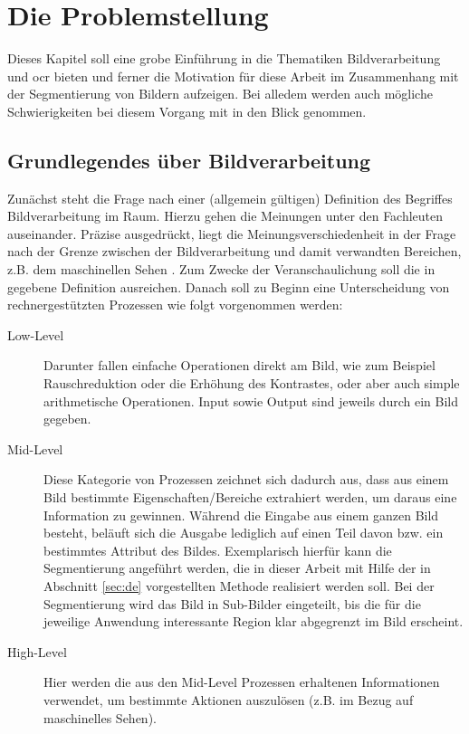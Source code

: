 \chapter{Die Problemstellung}
\label{sec:prob}
	
	Dieses Kapitel soll eine grobe Einführung in die Thematiken Bildverarbeitung und \gls{ocr} bieten und ferner die Motivation für diese Arbeit im Zusammenhang mit der Segmentierung von Bildern aufzeigen. Bei alledem werden auch mögliche Schwierigkeiten bei diesem Vorgang mit in den Blick genommen.
	
	\section{Grundlegendes über Bildverarbeitung}
	\label{sec:bild-basics}
	
		Zunächst steht die Frage nach einer (allgemein gültigen) Definition des Begriffes Bildverarbeitung im Raum. Hierzu gehen die Meinungen unter den Fachleuten auseinander. Präzise ausgedrückt, liegt die Meinungsverschiedenheit in der Frage nach der Grenze zwischen der Bildverarbeitung und damit verwandten Bereichen, z.B. dem maschinellen Sehen \cite[S. 2]{gonzalez-woods}. Zum Zwecke der Veranschaulichung soll die in \cite[S. 2]{gonzalez-woods} gegebene Definition ausreichen. Danach soll zu Beginn eine Unterscheidung von rechnergestützten Prozessen wie folgt vorgenommen werden:
		\begin{description}
			\item[Low-Level] Darunter fallen einfache Operationen direkt am Bild, wie zum Beispiel Rauschreduktion oder die Erhöhung des Kontrastes, oder aber auch simple arithmetische Operationen. Input sowie Output sind jeweils durch ein Bild gegeben.
			\item[Mid-Level] Diese Kategorie von Prozessen zeichnet sich dadurch aus, dass aus einem Bild bestimmte Eigenschaften/Bereiche extrahiert werden, um daraus eine Information zu gewinnen. Während die Eingabe aus einem ganzen Bild besteht, beläuft sich die Ausgabe lediglich auf einen Teil davon bzw. ein bestimmtes Attribut des Bildes. Exemplarisch hierfür kann die Segmentierung angeführt werden, die in dieser Arbeit mit Hilfe der in Abschnitt \ref{sec:de} vorgestellten Methode realisiert werden soll. Bei der Segmentierung wird das Bild in Sub-Bilder eingeteilt, bis die für die jeweilige Anwendung interessante Region klar abgegrenzt im Bild erscheint.
			\item[High-Level] Hier werden die aus den Mid-Level Prozessen erhaltenen Informationen verwendet, um bestimmte Aktionen auszulösen (z.B. im Bezug auf maschinelles Sehen).
		\end{description}
